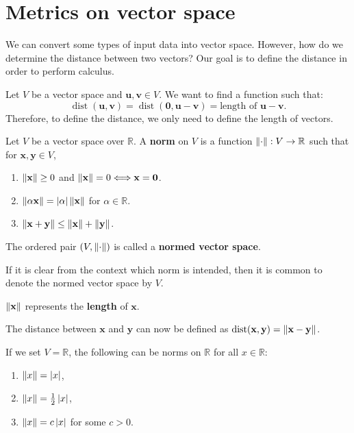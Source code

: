 \documentclass{huhtakm-template-book-v2}
\DeclareMathOperator{\dist}{dist}
\begin{document}
\section{Metrics on vector space}
    We can convert some types of input data into vector space. However, how do we determine the distance between two vectors? Our goal is to define the distance in order to perform calculus.

    Let $V$ be a vector space and $\mathbf{u}, \mathbf{v} \in V$. We want to find a function such that:
    \begin{equation*}
        \dist(\mathbf{u}, \mathbf{v}) = \dist(\mathbf{0}, \mathbf{u} - \mathbf{v}) = \text{length of } \mathbf{u} - \mathbf{v}.
    \end{equation*}
    Therefore, to define the distance, we only need to define the length of vectors.
    \begin{defn}
        Let $V$ be a vector space over $\mathbb{R}$. A \textbf{norm} on $V$ is a function $\lVert{\cdot}\rVert: V \to \mathbb{R}$ such that for $\mathbf{x}, \mathbf{y} \in V$,
        \begin{enumerate}
            \item $\lVert{\mathbf{x}}\rVert \geq 0$ and $\lVert{\mathbf{x}}\rVert = 0 \Longleftrightarrow \mathbf{x} = \mathbf{0}$.
            \item $\lVert{\alpha \mathbf{x}}\rVert = \left|{\alpha}\right| \lVert{\mathbf{x}}\rVert$ for $\alpha \in \mathbb{R}$.
            \item $\lVert{\mathbf{x} + \mathbf{y}}\rVert \leq \lVert{\mathbf{x}}\rVert + \lVert{\mathbf{y}}\rVert$. 
        \end{enumerate}
        The ordered pair $(V, \lVert{\cdot}\rVert)$ is called a \textbf{normed vector space}.
    \end{defn}
    \begin{rem}
        If it is clear from the context which norm is intended, then it is common to denote the normed vector space by $V$.
    \end{rem}
    \begin{rem}
        $\lVert{\mathbf{x}}\rVert$ represents the \textbf{length} of $\mathbf{x}$.
    \end{rem}
    \begin{rem}
        The distance between $\mathbf{x}$ and $\mathbf{y}$ can now be defined as $\dist(\mathbf{x}, \mathbf{y}) = \norm{\mathbf{x} - \mathbf{y}}$.
    \end{rem}
    \begin{eg}
        If we set $V = \mathbb{R}$, the following can be norms on $\mathbb{R}$ for all $x \in \mathbb{R}$:
        \begin{enumerate}
            \item $\lVert{x}\rVert = \left|{x}\right|$,
            \item $\lVert{x}\rVert = \frac{1}{2} \left|{x}\right|$,
            \item $\lVert{x}\rVert = c \left|{x}\right|$ for some $c > 0$.
        \end{enumerate}
    \end{eg}
\end{document}
